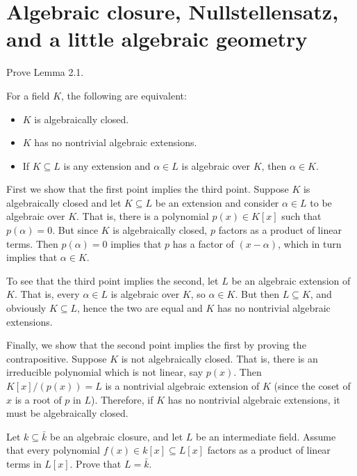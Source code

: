 \documentclass[../../master.tex]{subfiles}
\begin{document}
\section{Algebraic closure, Nullstellensatz, and a little algebraic geometry}

\begin{problem}
    Prove Lemma 2.1.
    \begin{proposition}[Lemma 2.1] 
        For a field $K$, the following are equivalent:
        \begin{itemize}
            \item $K$ is algebraically closed.
            \item $K$ has no nontrivial algebraic extensions.
            \item If $K \subseteq L$ is any extension and $\alpha \in L$ is algebraic over $K$, then $\alpha \in K$.
        \end{itemize}
    \end{proposition}
\end{problem}

\begin{solution}
    First we show that the first point implies the third point.
    Suppose $K$ is algebraically closed and let $K \subseteq L$ be an extension and consider $\alpha \in L$ to be algebraic over $K$.
    That is, there is a polynomial $p(x) \in K[x]$ such that $p(\alpha) = 0$.
    But since $K$ is algebraically closed, $p$ factors as a product of linear terms.
    Then $p(\alpha) = 0$ implies that $p$ has a factor of $(x - \alpha)$, which in turn implies that $\alpha \in K$.

    To see that the third point implies the second, let $L$ be an algebraic extension of $K$.
    That is, every $\alpha \in L$ is algebraic over $K$, so $\alpha \in K$.
    But then $L \subseteq K$, and obviously $K \subseteq L$, hence the two are equal and $K$ has no nontrivial algebraic extensions.

    Finally, we show that the second point implies the first by proving the contrapositive.
    Suppose $K$ is not algebraically closed.
    That is, there is an irreducible polynomial which is not linear, say $p(x)$.
    Then $K[x] / (p(x)) = L$ is a nontrivial algebraic extension of $K$ (since the coset of $x$ is a root of $p$ in $L$).
    Therefore, if $K$ has no nontrivial algebraic extensions, it must be algebraically closed.
\end{solution}

\begin{problem}
    Let $k \subseteq \bar{k}$ be an algebraic closure, and let $L$ be an intermediate field.
    Assume that every polynomial $f(x) \in k[x] \subseteq L[x]$ factors as a product of linear terms in $L[x]$.
    Prove that $L = \bar{k}$.
\end{problem}
\end{document}
